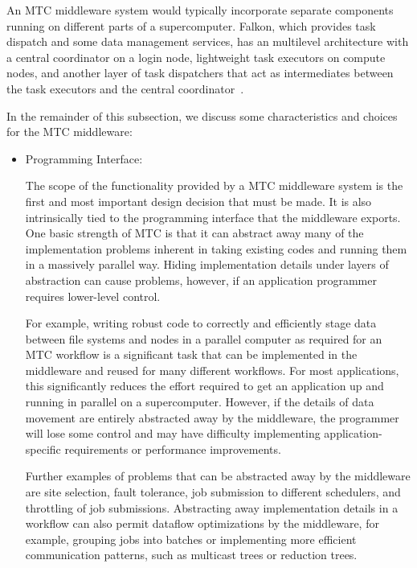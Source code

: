 \documentclass[10pt,letterpaper]{article}
\begin{document}
An MTC middleware system would typically incorporate separate components running on
different parts of a supercomputer.  Falkon, which provides task dispatch and some data
management services, has an multilevel architecture with
a central coordinator on a login node, lightweight task executors on compute nodes, and another layer of
task dispatchers that act as intermediates between the task executors and the central coordinator~\cite{falkon}.

In the remainder of this subsection, we discuss some characteristics and choices for the MTC middleware:

\begin{itemize}
  \item Programming Interface:

    The scope of the functionality provided by a MTC middleware system is
    the first and most important design decision that must be made.  
    It is also intrinsically tied to the 
    programming interface that the middleware exports.  One basic strength of MTC is that it
    can abstract away many of the implementation problems inherent in taking 
    existing codes and running them in a massively parallel way.  Hiding
    implementation details under layers of abstraction can cause problems, however, if an
    application programmer requires lower-level control. 

    For example, writing robust code to correctly and efficiently stage data between 
    file systems and nodes in a parallel computer as required for an MTC workflow
    is a significant task that can be implemented in the middleware and reused
    for many different workflows.  For most applications, this significantly
    reduces the effort required to get an application up and running in parallel
    on a supercomputer.  However, if the details of data movement are entirely 
    abstracted away by the middleware, the
    programmer will lose some control and may have difficulty implementing 
    application-specific requirements or performance improvements.

    Further examples of problems that can be abstracted away by the middleware are
    site selection, fault tolerance, job submission to different schedulers, and 
    throttling of job submissions.  Abstracting away implementation details in
    a workflow can also permit dataflow optimizations by the middleware, for example,
    grouping jobs into batches or implementing more 
    efficient communication patterns, such as multicast trees or reduction trees.
    


\end{itemize}
\end{document}
